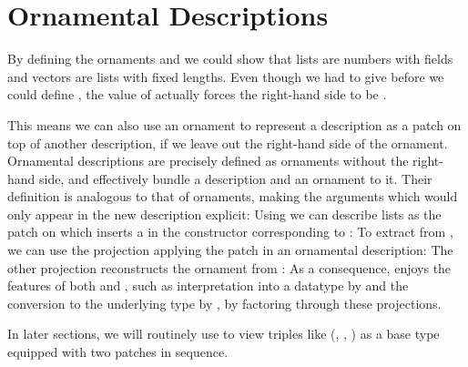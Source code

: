 
\section{Ornamental Descriptions}\label{sec:background-ornamental-descriptions}
By defining the ornaments  and  we could show that lists are numbers with fields and vectors are lists with fixed lengths. Even though we had to give  before we could define , the value of  actually forces the right-hand side to be . 

This means we can also use an ornament to represent a description as a patch on top of another description, if we leave out the right-hand side of the ornament. Ornamental descriptions are precisely defined as ornaments without the right-hand side, and effectively bundle a description and an ornament to it. Their definition is analogous to that of ornaments, making the arguments which would only appear in the new description explicit:
Using  we can describe lists as the patch on  which inserts a  in the constructor corresponding to :
To extract  from , we can use the projection applying the patch in an ornamental description:
The other projection reconstructs the ornament  from :
As a consequence,  enjoys the features of both  and , such as interpretation into a datatype by  and the conversion to the underlying type by , by factoring through these projections.

In later sections, %
we will routinely use  to view triples like (, , ) as a base type equipped with two patches in sequence.


